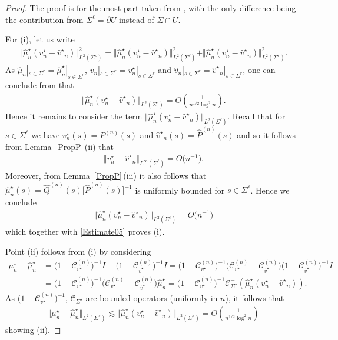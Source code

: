 \documentclass[11pt]{article}
\numberwithin{equation}{section}
\newcommand{\Id}{I}
\newcommand{\hQ}{{\widehat Q}}
\newcommand{\smu}{\mu^\star}
\newcommand{\shmu}{\widehat \mu^\star}
\newcommand{\hmu}{{\widehat \mu}}
\newcommand{\bP}{P}
\newcommand{\hP}{{\widehat P}}
\newcommand{\bv}{v}
\newcommand{\hv}{{\widehat v}}
\newcommand{\sbv}{v^\star}
\newcommand{\shv}{{\widehat v^\star}}
\newcommand{\sCau}{\mathcal C_{\Sigma^\star}}
\newcommand{\sCauv}{\mathcal C_{\bv^\star}}
\newcommand{\sCauhv}{\mathcal C_{\hv^\star}}
\newcommand{\Sigl}{\Sigma^\ell}
\newcommand{\Sigr}{\Sigma^r}
\numberwithin{equation}{section}
\begin{document}
\begin{proof}
The proof is for the most part taken from \cite[Proposition~B.2]{CD}, with the only difference being the contribution from $\Sigl =\partial U$ instead of $\Sigma \cap U$.

For (i), let us write
\begin{align}\label{IntDecomp}
 \Vert \shmu_n (\sbv_n - \shv_n) \Vert_{L^2(\Sigma^\star)}^2 = \Vert \shmu_n (\sbv_n - \shv_n) \Vert_{L^2(\Sigl)}^2 + \Vert \shmu_n (\sbv_n - \shv_n) \Vert_{L^2(\Sigr)}^2.
\end{align}
As $\hmu_n|_{s\in \Sigr} = \shmu_n|_{s\in\Sigr}$, $\bv_n|_{s\in \Sigr} = \sbv_n|_{s\in\Sigr}$ and $\hv_n|_{s\in \Sigr} = \shv_n|_{s\in\Sigr}$, one can conclude from \cite[equation~5.1]{CD} that
\begin{align} \label{Estimate05}
 \Vert \shmu_n (\sbv_n - \shv_n) \Vert_{L^2(\Sigr)} = O\left(\frac{1}{n^{1/2}\log^2 n}\right).
\end{align}
Hence it remains to consider the term $\Vert \shmu_n (\sbv_n - \shv_n) \Vert_{L^2(\Sigl)}$. Recall that for $s \in \Sigl$ we have $\sbv_n(s) = \bP^{(n)}(s)$ and $\shv_n(s) = \hP^{(n)}(s)$ and so it follows from Lemma~\ref{PropP}\,(ii) that
\begin{align}\label{jumpsComparison}
 \Vert \sbv_n - \shv_n \Vert_{L^\infty(\Sigl)} = O\big(n^{-1}\big).
\end{align}
Moreover, from Lemma~\ref{PropP}\,(iii) it also follows that $\shmu_n(s) = \hQ^{(n)}(s) \big[\hP^{(n)}(s)\big]^{-1}$ is uniformly bounded for $s \in \Sigl$. Hence we conclude
\begin{align*}
 \Vert \shmu_n (\sbv_n - \shv_n) \Vert_{L^2(\Sigl)} = O\bigl(n^{-1}\bigr)
\end{align*}
which together with \eqref{Estimate05} proves (i).

Point (ii) follows from (i) by considering
\begin{align*}
 \smu_n - \shmu_n &= \big(1-\sCauv^{(n)}\big)^{-1} \Id - \big(1-\sCauhv^{(n)}\big)^{-1}\Id
= \big(1-\sCauv^{(n)}\big)^{-1}\big(\sCauv^{(n)}-\sCauhv^{(n)}\big) \big(1-\sCauhv^{(n)}\big)^{-1}\Id
 \\
 &= \big(1-\sCauv^{(n)}\big)^{-1}\big(\sCauv^{(n)}-\sCauhv^{(n)}\big)\shmu_n= \big(1-\sCauv^{(n)}\big)^{-1}\sCau^-(\shmu_n(\sbv_n-\shv_n)).
\end{align*}
As $\big(1-\sCauv^{(n)}\big)^{-1}$, $\sCau^-$ are bounded operators (uniformly in $n$), it follows that{\samepage
\begin{align*}
 \Vert \smu_n - \shmu_n \Vert_{L^2(\Sigma^\star)} \lesssim \Vert \shmu_n(\sbv_n-\shv_n) \Vert_{L^2(\Sigma^\star)} = O\left(\frac{1}{n^{1/2}\log^2 n}\right)
\end{align*}
showing (ii).}


\end{proof}
\end{document}
